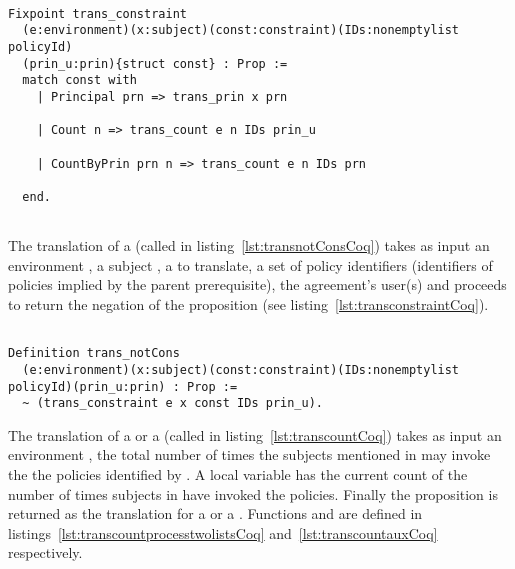 \begin{minipage}[c]{0.95\textwidth}
\begin{lstlisting}

Fixpoint trans_constraint 
  (e:environment)(x:subject)(const:constraint)(IDs:nonemptylist policyId)
  (prin_u:prin){struct const} : Prop := 
  match const with
    | Principal prn => trans_prin x prn
  
    | Count n => trans_count e n IDs prin_u

    | CountByPrin prn n => trans_count e n IDs prn 

  end.
  
\end{lstlisting}
\end{minipage}

The translation of a  (called  in listing~\ref{lst:transnotConsCoq}) takes as input 
an environment , a subject , a   to translate, a set of policy identifiers  (identifiers of policies implied by the parent prerequisite), the agreement's user(s)  and proceeds to return the negation of the proposition  (see listing~\ref{lst:transconstraintCoq}).

\begin{lstlisting}

Definition trans_notCons
  (e:environment)(x:subject)(const:constraint)(IDs:nonemptylist policyId)(prin_u:prin) : Prop :=
  ~ (trans_constraint e x const IDs prin_u).
\end{lstlisting}


The translation of a  or a  (called  in listing~\ref{lst:transcountCoq}) takes as input an environment ,  the total number of times the subjects mentioned in  may invoke the 
the policies identified by .
A local variable  has the current count of the number of times subjects in  have invoked the policies. Finally the proposition  is returned as the translation for a  or a . Functions  and  are defined in listings~\ref{lst:transcountprocesstwolistsCoq} and~\ref{lst:transcountauxCoq} respectively.

